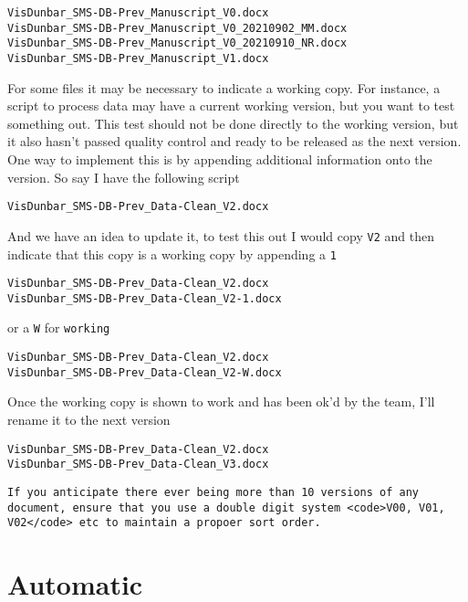 \documentclass[
]{book}
\begin{document}
\begin{verbatim}
VisDunbar_SMS-DB-Prev_Manuscript_V0.docx
VisDunbar_SMS-DB-Prev_Manuscript_V0_20210902_MM.docx
VisDunbar_SMS-DB-Prev_Manuscript_V0_20210910_NR.docx
VisDunbar_SMS-DB-Prev_Manuscript_V1.docx
\end{verbatim}

For some files it may be necessary to indicate a working copy. For instance, a script to process data may have a current working version, but you want to test something out. This test should not be done directly to the working version, but it also hasn't passed quality control and ready to be released as the next version. One way to implement this is by appending additional information onto the version. So say I have the following script

\begin{verbatim}
VisDunbar_SMS-DB-Prev_Data-Clean_V2.docx
\end{verbatim}

And we have an idea to update it, to test this out I would copy \texttt{V2} and then indicate that this copy is a working copy by appending a \texttt{1}

\begin{verbatim}
VisDunbar_SMS-DB-Prev_Data-Clean_V2.docx
VisDunbar_SMS-DB-Prev_Data-Clean_V2-1.docx
\end{verbatim}

or a \texttt{W} for \texttt{working}

\begin{verbatim}
VisDunbar_SMS-DB-Prev_Data-Clean_V2.docx
VisDunbar_SMS-DB-Prev_Data-Clean_V2-W.docx
\end{verbatim}

Once the working copy is shown to work and has been ok'd by the team, I'll rename it to the next version

\begin{verbatim}
VisDunbar_SMS-DB-Prev_Data-Clean_V2.docx
VisDunbar_SMS-DB-Prev_Data-Clean_V3.docx
\end{verbatim}

\begin{verbatim}
If you anticipate there ever being more than 10 versions of any document, ensure that you use a double digit system <code>V00, V01, V02</code> etc to maintain a propoer sort order.
\end{verbatim}

\hypertarget{automatic}{%
\section*{Automatic}\label{automatic}}
\end{document}
